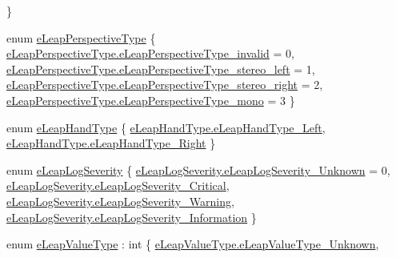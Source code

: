 \begin{DoxyCompactItemize}
 \}
\item 
enum \mbox{\hyperlink{namespace_leap_internal_af2a2bc35637b8a453ff772a09a0987a1}{e\+Leap\+Perspective\+Type}} \{ \mbox{\hyperlink{namespace_leap_internal_af2a2bc35637b8a453ff772a09a0987a1a1700b1723949d4ddf66d058db4b8ce78}{e\+Leap\+Perspective\+Type.\+e\+Leap\+Perspective\+Type\+\_\+invalid}} = 0, 
\mbox{\hyperlink{namespace_leap_internal_af2a2bc35637b8a453ff772a09a0987a1a45026c30f78dfb8b110a6f993ce3229f}{e\+Leap\+Perspective\+Type.\+e\+Leap\+Perspective\+Type\+\_\+stereo\+\_\+left}} = 1, 
\mbox{\hyperlink{namespace_leap_internal_af2a2bc35637b8a453ff772a09a0987a1a9529dc27ead1c75b576a3ef1c8de104f}{e\+Leap\+Perspective\+Type.\+e\+Leap\+Perspective\+Type\+\_\+stereo\+\_\+right}} = 2, 
\mbox{\hyperlink{namespace_leap_internal_af2a2bc35637b8a453ff772a09a0987a1a7240547cca84c03a120bf91829e6c9e5}{e\+Leap\+Perspective\+Type.\+e\+Leap\+Perspective\+Type\+\_\+mono}} = 3
 \}
\item 
enum \mbox{\hyperlink{namespace_leap_internal_a937dea95e06bb1e2723e0dbb486c9b34}{e\+Leap\+Hand\+Type}} \{ \mbox{\hyperlink{namespace_leap_internal_a937dea95e06bb1e2723e0dbb486c9b34a13236d6b3c0dd381275ef0576691528d}{e\+Leap\+Hand\+Type.\+e\+Leap\+Hand\+Type\+\_\+\+Left}}, 
\mbox{\hyperlink{namespace_leap_internal_a937dea95e06bb1e2723e0dbb486c9b34a9b5ad9312da49e8744e9ccd100afcef8}{e\+Leap\+Hand\+Type.\+e\+Leap\+Hand\+Type\+\_\+\+Right}}
 \}
\item 
enum \mbox{\hyperlink{namespace_leap_internal_ae47258155c35d1f200b0dd25bd0adb5b}{e\+Leap\+Log\+Severity}} \{ \mbox{\hyperlink{namespace_leap_internal_ae47258155c35d1f200b0dd25bd0adb5baf1b3240fd9f735123ef6d96a82f90402}{e\+Leap\+Log\+Severity.\+e\+Leap\+Log\+Severity\+\_\+\+Unknown}} = 0, 
\mbox{\hyperlink{namespace_leap_internal_ae47258155c35d1f200b0dd25bd0adb5ba7b367d05db6709fce44df024a84b5b24}{e\+Leap\+Log\+Severity.\+e\+Leap\+Log\+Severity\+\_\+\+Critical}}, 
\mbox{\hyperlink{namespace_leap_internal_ae47258155c35d1f200b0dd25bd0adb5bacc26cf41c940161200f9d672453d0ecc}{e\+Leap\+Log\+Severity.\+e\+Leap\+Log\+Severity\+\_\+\+Warning}}, 
\mbox{\hyperlink{namespace_leap_internal_ae47258155c35d1f200b0dd25bd0adb5ba2555740a42239566ca7fed81065a8b05}{e\+Leap\+Log\+Severity.\+e\+Leap\+Log\+Severity\+\_\+\+Information}}
 \}
\item 
enum \mbox{\hyperlink{namespace_leap_internal_a9c15e305893cd05c1ec6d65cea48737c}{e\+Leap\+Value\+Type}} \+: int \{ \newline
\mbox{\hyperlink{namespace_leap_internal_a9c15e305893cd05c1ec6d65cea48737ca27418bf690bcd158989f7e4ca9d76632}{e\+Leap\+Value\+Type.\+e\+Leap\+Value\+Type\+\_\+\+Unknown}}, 

\end{DoxyCompactItemize}
